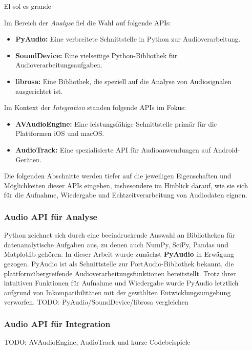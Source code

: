 \documentclass[11pt,a4paper]{article}
\begin{document}
El sol es grande

\noindent \newline
Im Bereich der \textit{Analyse} fiel die Wahl auf folgende APIs:

\begin{itemize}
	\item \textbf{PyAudio:} Eine verbreitete Schnittstelle in Python zur Audioverarbeitung.
	\item \textbf{SoundDevice:} Eine vielseitige Python-Bibliothek für Audioverarbeitungsaufgaben.
	\item \textbf{librosa:} Eine Bibliothek, die speziell auf die Analyse von Audiosignalen
	      ausgerichtet ist.
\end{itemize}

\noindent
Im Kontext der \textit{Integration} standen folgende APIs im Fokus:

\begin{itemize}
	\item \textbf{AVAudioEngine:} Eine leistungsfähige Schnittstelle primär für die Plattformen iOS
	      und macOS.
	\item \textbf{AudioTrack:} Eine spezialisierte API für Audioanwendungen auf Android-Geräten.
\end{itemize}

\noindent
Die folgenden Abschnitte werden tiefer auf die jeweiligen Eigenschaften und Möglichkeiten dieser
APIs eingehen, insbesondere im Hinblick darauf, wie sie sich für die Aufnahme, Wiedergabe und
Echtzeitverarbeitung von Audiodaten eignen.

\subsubsection{Audio API für Analyse}
Python zeichnet sich durch eine beeindruckende Auswahl an Bibliotheken für datenanalytische Aufgaben
aus, zu denen auch NumPy, SciPy, Pandas und Matplotlib gehören. In dieser Arbeit wurde zunächst
\textbf{PyAudio} in Erwägung gezogen. PyAudio ist als Schnittstelle zur PortAudio-Bibliothek
bekannt, die plattformübergreifende Audioverarbeitungsfunktionen bereitstellt. Trotz ihrer
intuitiven Funktionen für Aufnahme und Wiedergabe wurde PyAudio letztlich aufgrund von
Inkompatibilitäten mit der gewählten Entwicklungsumgebung verworfen.
TODO: PyAudio/SoundDevice/librosa vergleichen

\subsubsection{Audio API für Integration}
TODO: AVAudioEngine, AudioTrack und kurze Codebeispiele
\end{document}
